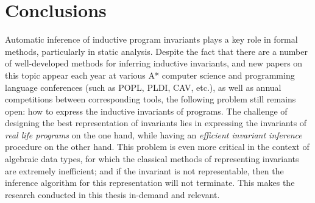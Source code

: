 \section{Conclusions}\label{sec:background/conclusion}
Automatic inference of inductive program invariants plays a key role in formal methods, particularly in static analysis.
Despite the fact that there are a number of well-developed methods for inferring inductive invariants,
and new papers on this topic appear each year at various A* computer science and programming language conferences (such as POPL, PLDI, CAV, etc.), as well as annual competitions between corresponding tools, 
the following problem still remains open: how to express the inductive invariants of programs.
The challenge of designing the best representation of invariants lies in expressing the invariants of \emph{real life programs} on the one hand, while having an \emph{efficient invariant inference} procedure on the other hand.
This problem is even more critical in the context of algebraic data types, for which the classical methods of representing invariants are extremely inefficient; and if the invariant is not representable, then the inference algorithm for this representation will not terminate.
This makes the research conducted in this thesis in-demand and relevant.